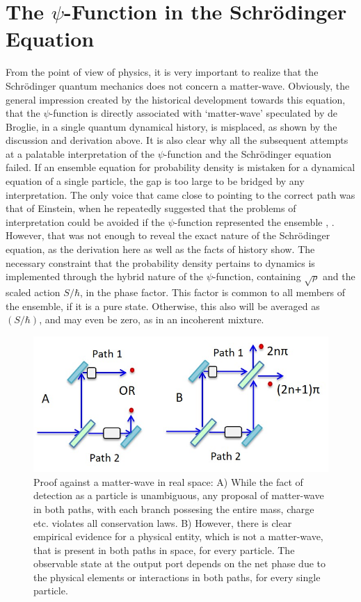 \section{The $\psi$-Function in the Schr\"{o}dinger\\ Equation}\label{c14-sec3}

From the point of view of physics, it is very important to realize that the Schr\"{o}dinger
quantum mechanics does not concern a matter-wave. 
Obviously, the general impression created by the historical development towards
this equation, that the $\psi$-function is directly associated with `matter-wave' 
speculated by de Broglie, in a single quantum dynamical history, is misplaced, as shown by the discussion and
derivation above. It is also clear why all the subsequent attempts at a palatable interpretation 
of the $\psi$-function and the Schr\"{o}dinger equation failed. If an ensemble equation for probability
density is mistaken for a dynamical equation of a single particle, the gap is too large to be
bridged by any interpretation. The only voice that came close to pointing to the correct path
was that of Einstein, when he repeatedly suggested that the problems of interpretation could be
avoided if the $\psi$-function represented the ensemble \cite{chap14-key3}, \cite{chap14-key4}. However, that was not 
enough to reveal the exact nature of the Schr\"{o}dinger equation, as
the derivation here as well as the facts of history show. The necessary constraint that the probability density pertains to
dynamics is implemented through the hybrid nature of the $\psi$-function, containing $\sqrt{\rho}$ and
the scaled action $S/\hbar$, in the phase factor. This factor is common to all members
of the ensemble, if it is a pure state. Otherwise, this also will be averaged as $(S/\hbar)$, and
may even be zero, as in an incoherent mixture.

\begin{figure}[t]
\centering
\includegraphics[scale=0.8]{src/images/chap27/1.jpg}
\caption{Proof against a matter-wave in real space: A) While the fact of detection as a particle is
unambiguous, any proposal of matter-wave in both paths, with each branch possesing the entire
mass, charge etc. violates all conservation laws. B) However, there is clear empirical evidence for
a physical entity, which is not a matter-wave, that is present in both paths in space, for every
particle. The observable state at the output port depends on the net phase due to the physical elements or interactions  
in both paths, for every single particle.}\label{ch14-fig1}
\end{figure}

